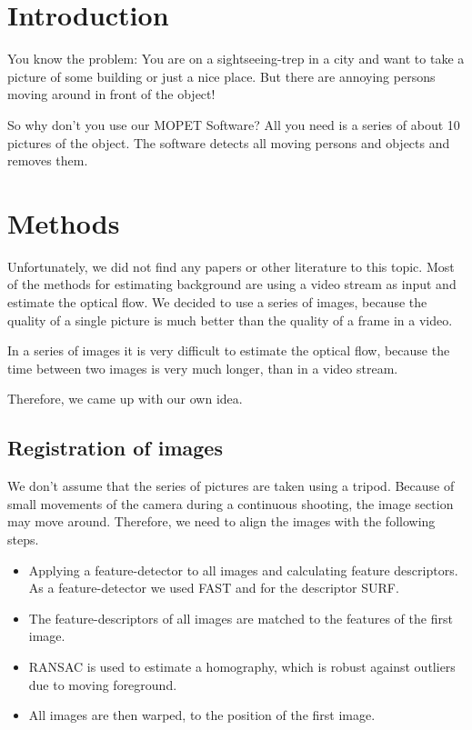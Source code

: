 \chapter{Introduction}

You know the problem: You are on a sightseeing-trep in a city and want to take a picture of some
building or just a nice place. But there are annoying persons moving around in front
of the object!

So why don't you use our MOPET Software?
All you need is a series of about 10 pictures of the object. The software 
detects all moving persons and objects and removes them.



\chapter{Methods}

Unfortunately, we did not find any papers or other literature to this topic. Most of the methods for estimating
background are using a video stream as input and estimate the optical flow.
We decided to use a series of images,
because the quality of a single picture is much better than the quality of a frame in a video.

In a series of images it is very difficult to estimate the optical flow, because the time between
two images is very much longer, than in a video stream.

Therefore, we came up with our own idea.

\section{Registration of images}

We don't assume that the series of pictures are taken using a tripod.
Because of small movements of the camera during a continuous shooting, the image section may move
around.
Therefore, we need to align the images with the following steps.

\begin{itemize}
 \item Applying a feature-detector to all images and calculating feature descriptors.
  As a feature-detector we used FAST and for the descriptor SURF.
 \item The feature-descriptors of all images are matched to the features of the first image.
 \item RANSAC is used to estimate a homography, which is robust against outliers due to moving foreground.
 \item All images are then warped, to the position of the first image.
\end{itemize}



